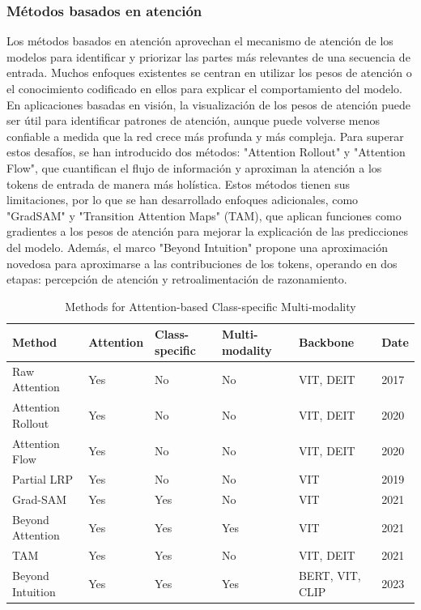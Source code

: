 \subsubsection{ Métodos basados en atención}
Los métodos basados en atención aprovechan el mecanismo de atención de los modelos para identificar y priorizar las partes más relevantes de una secuencia de entrada. Muchos enfoques existentes se centran en utilizar los pesos de atención o el conocimiento codificado en ellos para explicar el comportamiento del modelo. En aplicaciones basadas en visión, la visualización de los pesos de atención puede ser útil para identificar patrones de atención, aunque puede volverse menos confiable a medida que la red crece más profunda y más compleja. Para superar estos desafíos, se han introducido dos métodos: "Attention Rollout" y "Attention Flow", que cuantifican el flujo de información y aproximan la atención a los tokens de entrada de manera más holística. Estos métodos tienen sus limitaciones, por lo que se han desarrollado enfoques adicionales, como "GradSAM" y "Transition Attention Maps" (TAM), que aplican funciones como gradientes a los pesos de atención para mejorar la explicación de las predicciones del modelo. Además, el marco "Beyond Intuition" propone una aproximación novedosa para aproximarse a las contribuciones de los tokens, operando en dos etapas: percepción de atención y retroalimentación de razonamiento.

\begin{table}[htbp]
	\centering
	\caption{Methods for Attention-based Class-specific Multi-modality}
	\label{tab:methods}
	\begin{tabular}{llllll}
		\toprule
		Method & Attention & Class-specific & Multi-modality & Backbone & Date \\
		\midrule
		Raw Attention & Yes & No & No & VIT, DEIT & 2017 \\
		Attention Rollout & Yes & No & No & VIT, DEIT & 2020 \\
		Attention Flow & Yes & No & No & VIT, DEIT & 2020 \\
		Partial LRP & Yes & No & No & VIT & 2019 \\
		Grad-SAM & Yes & Yes & No & VIT & 2021 \\
		Beyond Attention & Yes & Yes & Yes & VIT & 2021 \\
		TAM & Yes & Yes & No & VIT, DEIT & 2021 \\
		Beyond Intuition & Yes & Yes & Yes & BERT, VIT, CLIP & 2023 \\
		\bottomrule
	\end{tabular}
\end{table}

